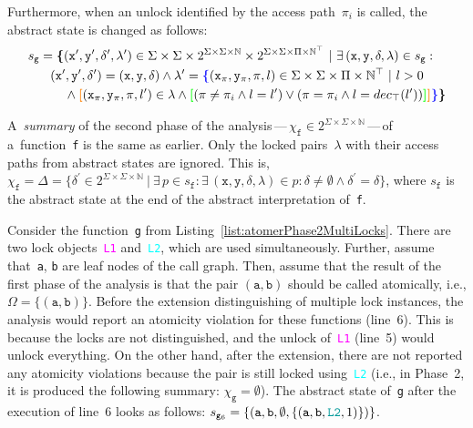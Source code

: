 Furthermore, when an unlock identified by the access path~$ \pi_i $ is called, the abstract state is changed as follows:
$$
\begin{multlined}
    s_\mathtt{g} = \bb{\{}(\mathtt{x}^\prime, \mathtt{y}^\prime, \delta^\prime, \lambda^\prime) \in \Sigma \times \Sigma \times 2^{\Sigma \times \Sigma \times \mathbb{N}} \times 2^{\Sigma \times \Sigma \times \Pi \times \mathbb{N}^\top}\ |\ \exists\,(\mathtt{x}, \mathtt{y}, \delta, \lambda) \in s_\mathtt{g} : \\ 
%
    (\mathtt{x}^\prime, \mathtt{y}^\prime, \delta^\prime) = (\mathtt{x}, \mathtt{y}, \delta) \wedge \lambda^\prime = \bA{\{}(\mathtt{x}_\pi, \mathtt{y}_\pi, \pi, l) \in \Sigma \times \Sigma \times \Pi \times \mathbb{N}^\top\ |\ l > 0 \\
%
    \wedge \bB{[}(\mathtt{x}_\pi, \mathtt{y}_\pi, \pi, l^\prime) \in \lambda \wedge \bD{[}(\pi \neq \pi_i \wedge l = l^\prime) \vee (\pi = \pi_i \wedge l = dec_\top(l^\prime))
%
    \bD{]}\bB{]}\bA{\}}\bb{\}}
\end{multlined}
$$

A~\emph{summary} of the second phase of the analysis\,---\,$ \chi_\mathtt{f} \in 2^{\Sigma \times \Sigma \times \mathbb{N}} $\,---\,of a~function~\texttt{f} is the same as earlier. Only the locked pairs~$ \lambda $ with their access paths from abstract states are ignored. This is, $ \chi_\mathtt{f} = \Delta = \{\delta^\prime \in 2^{\Sigma \times \Sigma \times \mathbb{N}}\ |\ \exists\,p \in s_\mathtt{f} : \exists\,(\mathtt{x}, \mathtt{y}, \delta, \lambda) \in p : \delta \neq \emptyset \wedge \delta^\prime = \delta\} $, where $ s_\mathtt{f} $ is the abstract state at the end of the abstract interpretation of~\texttt{f}.

\begin{example}
    Consider the function~\texttt{g} from Listing~\ref{list:atomerPhase2MultiLocks}. There are two lock objects~\textcolor{magenta}{\texttt{L1}} and~\textcolor{cyan}{\texttt{L2}}, which are used simultaneously. Further, assume that~\texttt{a}, \texttt{b} are leaf nodes of the call graph. Then, assume that the result of the first phase of the analysis is that the pair $ (\mathtt{a, b}) $ should be called atomically, i.e., $ \Omega = \{(\mathtt{a, b})\} $. Before the extension distinguishing of multiple lock instances, the analysis would report an atomicity violation for these functions (line~6). This is because the locks are not distinguished, and the unlock of~\textcolor{magenta}{\texttt{L1}} (line~5) would unlock everything. On the other hand, after the extension, there are not reported any atomicity violations because the pair is still locked using~\textcolor{cyan}{\texttt{L2}} (i.e., in Phase~2, it is produced the following summary: $ \chi_\mathtt{g} = \emptyset $). The abstract state of~\texttt{g} after the execution of line~6 looks as follows: $ s_{\mathtt{g}_6} = \{(\mathtt{a}, \mathtt{b}, \emptyset, \{(\mathtt{a}, \mathtt{b}, \textcolor{cyan}{\mathtt{L2}}, 1)\})\} $.
\end{example}

